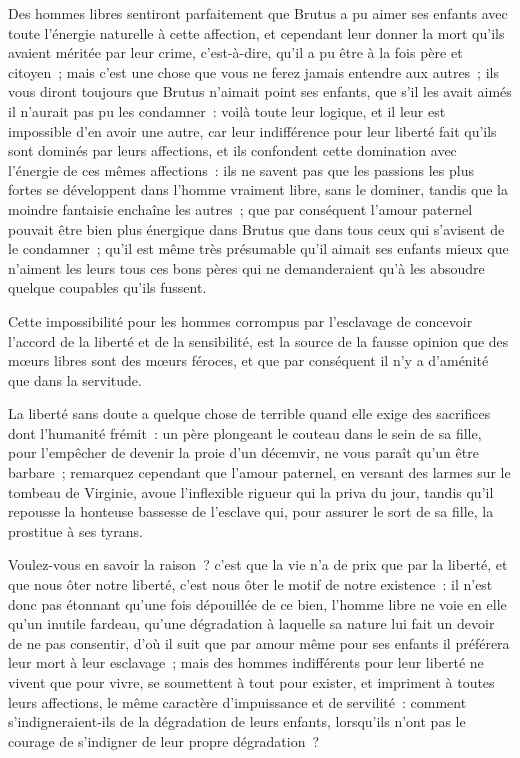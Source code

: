 \documentclass[french,twoside]{book} %
\begin{document}
Des hommes libres sentiront parfaitement que Brutus a pu aimer ses enfants avec toute l’énergie naturelle à cette affection, et cependant leur donner la mort qu’ils avaient méritée par leur crime, c’est-à-dire, qu’il a pu être à la fois père et citoyen ; mais c’est une chose que vous ne ferez jamais entendre aux autres ; ils vous diront toujours que Brutus n’aimait point ses enfants, que s’il les avait aimés il n’aurait pas pu les condamner : voilà toute leur logique, et il leur est impossible d’en avoir une autre, car leur indifférence pour leur liberté fait qu’ils sont dominés par leurs affections, et ils confondent cette domination avec l’énergie de ces mêmes affections : ils ne savent pas que les passions les plus fortes se développent dans l’homme vraiment libre, sans le dominer, tandis que la moindre fantaisie enchaîne les autres ; que par conséquent l’amour paternel pouvait être bien plus énergique dans Brutus que dans tous ceux qui s’avisent de le condamner ; qu’il est même très présumable qu’il aimait ses enfants mieux que n’aiment les leurs tous ces bons pères qui ne demanderaient qu’à les absoudre quelque coupables qu’ils fussent.\par
Cette impossibilité pour les hommes corrompus par l’esclavage de concevoir l’accord de la liberté et de la sensibilité, est la source de la fausse opinion que des mœurs libres sont des mœurs féroces, et que par conséquent il n’y a d’aménité que dans la servitude.\par
La liberté sans doute a quelque chose de terrible quand elle exige des sacrifices dont l’humanité frémit : un père plongeant le couteau dans le sein de sa fille, pour l’empêcher de devenir la proie d’un décemvir, ne vous paraît qu’un être barbare ; remarquez cependant que l’amour paternel, en versant des larmes sur le tombeau de Virginie, avoue l’inflexible rigueur qui la priva du jour, tandis qu’il repousse la honteuse bassesse de l’esclave qui, pour assurer le sort de sa fille, la prostitue à ses tyrans.\par
Voulez-vous en savoir la raison ? c’est que la vie n’a de prix que par la liberté, et que nous ôter notre liberté, c’est nous ôter le motif de notre existence : il n’est donc pas étonnant qu’une fois dépouillée de ce bien, l’homme libre ne voie en elle qu’un inutile fardeau, qu’une dégradation à laquelle sa nature lui fait un devoir de ne pas consentir, d’où il suit que par amour même pour ses enfants il préférera leur mort à leur esclavage ; mais des hommes indifférents pour leur liberté ne vivent que pour vivre, se soumettent à tout pour exister, et impriment à toutes leurs affections, le même caractère d’impuissance et de servilité : comment s’indigneraient-ils de la dégradation de leurs enfants, lorsqu’ils n’ont pas le courage de s’indigner de leur propre dégradation ?\par
\end{document}
